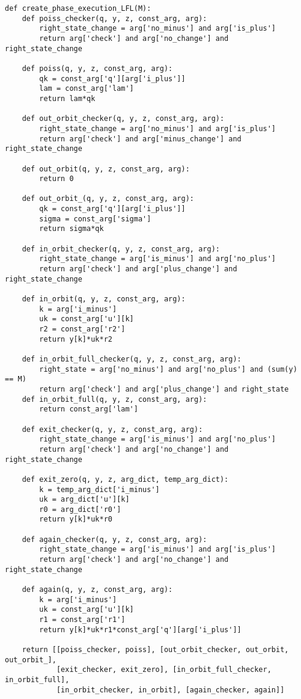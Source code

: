 \begin{verbatim}
def create_phase_execution_LFL(M):
    def poiss_checker(q, y, z, const_arg, arg):
        right_state_change = arg['no_minus'] and arg['is_plus']
        return arg['check'] and arg['no_change'] and right_state_change

    def poiss(q, y, z, const_arg, arg):
        qk = const_arg['q'][arg['i_plus']]
        lam = const_arg['lam']
        return lam*qk

    def out_orbit_checker(q, y, z, const_arg, arg):
        right_state_change = arg['no_minus'] and arg['is_plus']
        return arg['check'] and arg['minus_change'] and right_state_change

    def out_orbit(q, y, z, const_arg, arg):
        return 0

    def out_orbit_(q, y, z, const_arg, arg):
        qk = const_arg['q'][arg['i_plus']]
        sigma = const_arg['sigma']
        return sigma*qk

    def in_orbit_checker(q, y, z, const_arg, arg):
        right_state_change = arg['is_minus'] and arg['no_plus']
        return arg['check'] and arg['plus_change'] and right_state_change

    def in_orbit(q, y, z, const_arg, arg):
        k = arg['i_minus']
        uk = const_arg['u'][k]
        r2 = const_arg['r2']
        return y[k]*uk*r2

    def in_orbit_full_checker(q, y, z, const_arg, arg):
        right_state = arg['no_minus'] and arg['no_plus'] and (sum(y) == M)
        return arg['check'] and arg['plus_change'] and right_state
    def in_orbit_full(q, y, z, const_arg, arg):
        return const_arg['lam']

    def exit_checker(q, y, z, const_arg, arg):
        right_state_change = arg['is_minus'] and arg['no_plus']
        return arg['check'] and arg['no_change'] and right_state_change

    def exit_zero(q, y, z, arg_dict, temp_arg_dict):
        k = temp_arg_dict['i_minus']
        uk = arg_dict['u'][k]
        r0 = arg_dict['r0']
        return y[k]*uk*r0

    def again_checker(q, y, z, const_arg, arg):
        right_state_change = arg['is_minus'] and arg['is_plus']
        return arg['check'] and arg['no_change'] and right_state_change

    def again(q, y, z, const_arg, arg):
        k = arg['i_minus']
        uk = const_arg['u'][k]
        r1 = const_arg['r1']
        return y[k]*uk*r1*const_arg['q'][arg['i_plus']]

    return [[poiss_checker, poiss], [out_orbit_checker, out_orbit, out_orbit_],
            [exit_checker, exit_zero], [in_orbit_full_checker, in_orbit_full],
            [in_orbit_checker, in_orbit], [again_checker, again]]
\end{verbatim}



